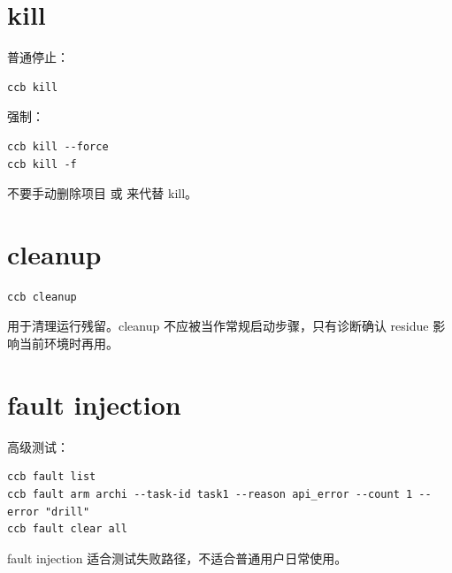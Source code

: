 \section{kill}

普通停止：

\begin{lstlisting}
ccb kill
\end{lstlisting}

强制：

\begin{lstlisting}
ccb kill --force
ccb kill -f
\end{lstlisting}

不要手动删除项目  或  来代替 kill。

\section{cleanup}

\begin{lstlisting}
ccb cleanup
\end{lstlisting}

用于清理运行残留。cleanup 不应被当作常规启动步骤，只有诊断确认 residue 影响当前环境时再用。

\section{fault injection}

高级测试：

\begin{lstlisting}
ccb fault list
ccb fault arm archi --task-id task1 --reason api_error --count 1 --error "drill"
ccb fault clear all
\end{lstlisting}

fault injection 适合测试失败路径，不适合普通用户日常使用。

